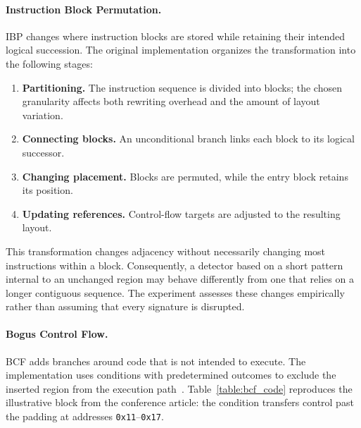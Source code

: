 \documentclass[runningheads]{llncs}
\begin{document}
\paragraph{Instruction Block Permutation.}
IBP changes where instruction blocks are stored while retaining their intended logical succession. The original implementation organizes the transformation into the following stages:

\begin{enumerate}
\item \textbf{Partitioning.} The instruction sequence is divided into blocks; the chosen granularity affects both rewriting overhead and the amount of layout variation.
    \item \textbf{Connecting blocks.} An unconditional branch links each block to its logical successor.
    \item \textbf{Changing placement.} Blocks are permuted, while the entry block retains its position.
    \item \textbf{Updating references.} Control-flow targets are adjusted to the resulting layout.

\end{enumerate}

This transformation changes adjacency without necessarily changing most instructions within a block. Consequently, a detector based on a short pattern internal to an unchanged region may behave differently from one that relies on a longer contiguous sequence. The experiment assesses these changes empirically rather than assuming that every signature is disrupted.
\paragraph{Bogus Control Flow.}
BCF adds branches around code that is not intended to execute. The implementation uses conditions with predetermined outcomes to exclude the inserted region from the execution path~\cite{bin2binobf,llvmobf}. Table~\ref{table:bcf_code} reproduces the illustrative block from the conference article: the condition transfers control past the padding at addresses \texttt{0x11}--\texttt{0x17}.
\end{document}
